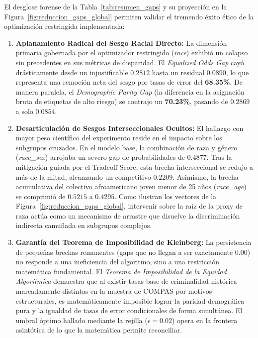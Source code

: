 \documentclass[11pt,a4paper]{article}
\begin{document}
El desglose forense de la Tabla~\ref{tab:resumen_gaps} y su proyección en la Figura~\ref{fig:reduccion_gaps_global} permiten validar el tremendo éxito ético de la optimización restringida implementada:
\begin{enumerate}
    \item \textbf{Aplanamiento Radical del Sesgo Racial Directo:} La dimensión primaria gobernada por el optimizador restringido (\textit{race}) exhibió un colapso sin precedentes en sus métricas de disparidad. El \textit{Equalized Odds Gap} cayó drásticamente desde un injustificable $0.2812$ hasta un residual $0.0890$, lo que representa una remoción neta del sesgo por tasas de error del \textbf{68.35\%}. De manera paralela, el \textit{Demographic Parity Gap} (la diferencia en la asignación bruta de etiquetas de alto riesgo) se contrajo un \textbf{70.23\%}, pasando de $0.2869$ a solo $0.0854$.
    
    \item \textbf{Desarticulación de Sesgos Interseccionales Ocultos:} El hallazgo con mayor peso científico del experimento reside en el impacto sobre los subgrupos cruzados. En el modelo base, la combinación de raza y género (\textit{race\_sex}) arrojaba un severo gap de probabilidades de $0.4877$. Tras la mitigación guiada por el Tradeoff Score, esta brecha interseccional se redujo a más de la mitad, alcanzando un competitivo $0.2209$. Asimismo, la brecha acumulativa del colectivo afroamericano joven menor de 25 años (\textit{race\_age}) se comprimió de $0.5215$ a $0.4295$. Como ilustran los vectores de la Figura~\ref{fig:reduccion_gaps_global}, intervenir sobre la raíz de la proxy de raza actúa como un mecanismo de arrastre que disuelve la discriminación indirecta camuflada en subgrupos complejos.
    
    \item \textbf{Garantía del Teorema de Imposibilidad de Kleinberg:} La persistencia de pequeñas brechas remanentes (gaps que no llegan a ser exactamente $0.00$) no responde a una ineficiencia del algoritmo, sino a una restricción matemática fundamental. El \textit{Teorema de Imposibilidad de la Equidad Algorítmica} demuestra que al existir tasas base de criminalidad histórica marcadamente distintas en la muestra de COMPAS por motivos estructurales, es matemáticamente imposible lograr la paridad demográfica pura y la igualdad de tasas de error condicionales de forma simultánea. El umbral óptimo hallado mediante la rejilla ($\epsilon=0.02$) opera en la frontera asintótica de lo que la matemática permite reconciliar.
\end{enumerate}
\end{document}
